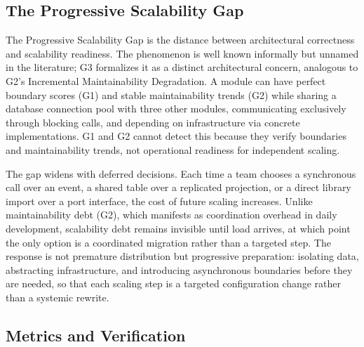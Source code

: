 \subsection*{The Progressive Scalability Gap}
\label{sec:g3-scalability-gap}

The Progressive Scalability Gap is the distance between architectural correctness and scalability readiness. The phenomenon is well known informally but unnamed in the literature; G3 formalizes it as a distinct architectural concern, analogous to G2's Incremental Maintainability Degradation. A module can have perfect boundary scores (G1) and stable maintainability trends (G2) while sharing a database connection pool with three other modules, communicating exclusively through blocking calls, and depending on infrastructure via concrete implementations. G1 and G2 cannot detect this because they verify boundaries and maintainability trends, not operational readiness for independent scaling.

The gap widens with deferred decisions. Each time a team chooses a synchronous call over an event, a shared table over a replicated projection, or a direct library import over a port interface, the cost of future scaling increases. Unlike maintainability debt (G2), which manifests as coordination overhead in daily development, scalability debt remains invisible until load arrives, at which point the only option is a coordinated migration rather than a targeted step. The response is not premature distribution but progressive preparation: isolating data, abstracting infrastructure, and introducing asynchronous boundaries before they are needed, so that each scaling step is a targeted configuration change rather than a systemic rewrite.

\subsection*{Metrics and Verification}

